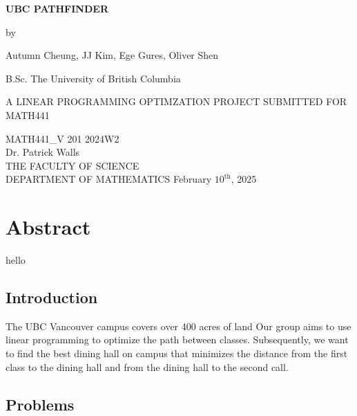 \documentclass[12pt]{report}
\begin{document}
\begin{titlepage}
    \centering
    \vspace*{1in}
    {\LARGE\bfseries UBC PATHFINDER\par}
    \vspace{1.5cm}
    {\Large by\par}
    \vspace{0.5cm}
    {\Large Autumn Cheung, JJ Kim, Ege Gures, Oliver Shen\par}
    \vspace{1cm}
    {\large B.Sc. The University of British Columbia\par}
    \vfill
    A LINEAR PROGRAMMING OPTIMZATION PROJECT SUBMITTED FOR MATH441\\
    \vspace{1cm}

    MATH441\_V 201 2024W2\\
    Dr. Patrick Walls\\
    \vspace{1cm}
    THE FACULTY OF SCIENCE\\
    DEPARTMENT OF MATHEMATICS
    \vfill
    {\large February $10^{\text{th}}$, 2025}
    \vfill

\end{titlepage}


\chapter*{Abstract}
hello 

\tableofcontents



\section{Introduction}
The UBC Vancouver campus covers over 400 acres of land 
Our group aims to use linear programming to optimize the path between classes. Subsequently, we want to find the best dining hall on campus that minimizes the distance from the first class to the dining hall and from the dining hall to the second call.

\section{Problems}
\end{document}
